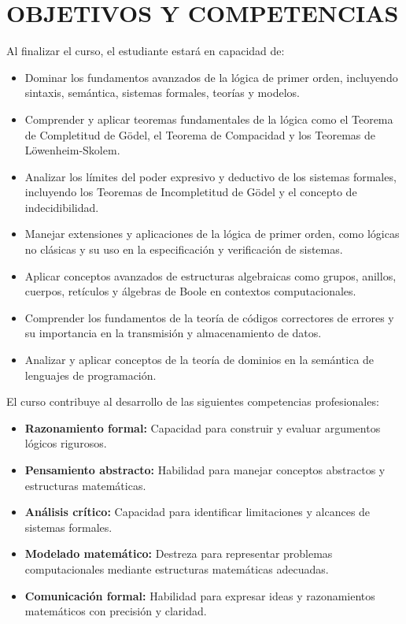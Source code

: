 \documentclass[12pt,a4paper]{article}
\begin{document}
\section{OBJETIVOS Y COMPETENCIAS}

\begin{objetivos}
Al finalizar el curso, el estudiante estará en capacidad de:
\begin{itemize}[leftmargin=*]
    \item Dominar los fundamentos avanzados de la lógica de primer orden, incluyendo sintaxis, semántica, sistemas formales, teorías y modelos.
    \item Comprender y aplicar teoremas fundamentales de la lógica como el Teorema de Completitud de Gödel, el Teorema de Compacidad y los Teoremas de Löwenheim-Skolem.
    \item Analizar los límites del poder expresivo y deductivo de los sistemas formales, incluyendo los Teoremas de Incompletitud de Gödel y el concepto de indecidibilidad.
    \item Manejar extensiones y aplicaciones de la lógica de primer orden, como lógicas no clásicas y su uso en la especificación y verificación de sistemas.
    \item Aplicar conceptos avanzados de estructuras algebraicas como grupos, anillos, cuerpos, retículos y álgebras de Boole en contextos computacionales.
    \item Comprender los fundamentos de la teoría de códigos correctores de errores y su importancia en la transmisión y almacenamiento de datos.
    \item Analizar y aplicar conceptos de la teoría de dominios en la semántica de lenguajes de programación.
\end{itemize}
\end{objetivos}

\begin{competencias}
El curso contribuye al desarrollo de las siguientes competencias profesionales:
\begin{itemize}[leftmargin=*]
    \item \textbf{Razonamiento formal:} Capacidad para construir y evaluar argumentos lógicos rigurosos.
    \item \textbf{Pensamiento abstracto:} Habilidad para manejar conceptos abstractos y estructuras matemáticas.
    \item \textbf{Análisis crítico:} Capacidad para identificar limitaciones y alcances de sistemas formales.
    \item \textbf{Modelado matemático:} Destreza para representar problemas computacionales mediante estructuras matemáticas adecuadas.
    \item \textbf{Comunicación formal:} Habilidad para expresar ideas y razonamientos matemáticos con precisión y claridad.
\end{itemize}
\end{competencias}
\vspace{0.5cm}
\end{document}
